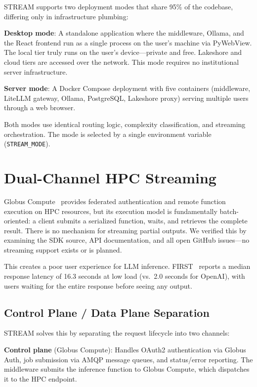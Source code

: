 \documentclass[manuscript, review]{acmart}
\begin{document}
STREAM supports two deployment modes that share 95\% of the codebase, differing only in infrastructure plumbing:

\textbf{Desktop mode}: A standalone application where the middleware, Ollama, and the React frontend run as a single process on the user's machine via PyWebView. The local tier truly runs on the user's device---private and free. Lakeshore and cloud tiers are accessed over the network. This mode requires no institutional server infrastructure.

\textbf{Server mode}: A Docker Compose deployment with five containers (middleware, LiteLLM gateway, Ollama, PostgreSQL, Lakeshore proxy) serving multiple users through a web browser.

Both modes use identical routing logic, complexity classification, and streaming orchestration. The mode is selected by a single environment variable (\texttt{STREAM\_MODE}).


\section{Dual-Channel HPC Streaming}
\label{sec:relay}

Globus Compute~\cite{globuscompute2024} provides federated authentication and remote function execution on HPC resources, but its execution model is fundamentally batch-oriented: a client submits a serialized function, waits, and retrieves the complete result. There is no mechanism for streaming partial outputs. We verified this by examining the SDK source, API documentation, and all open GitHub issues---no streaming support exists or is planned.

This creates a poor user experience for LLM inference. FIRST~\cite{first2025} reports a median response latency of 16.3 seconds at low load (vs.\ 2.0 seconds for OpenAI), with users waiting for the entire response before seeing any output.

\subsection{Control Plane / Data Plane Separation}

STREAM solves this by separating the request lifecycle into two channels:

\textbf{Control plane} (Globus Compute): Handles OAuth2 authentication via Globus Auth, job submission via AMQP message queues, and status/error reporting. The middleware submits the inference function to Globus Compute, which dispatches it to the HPC endpoint.
\end{document}
